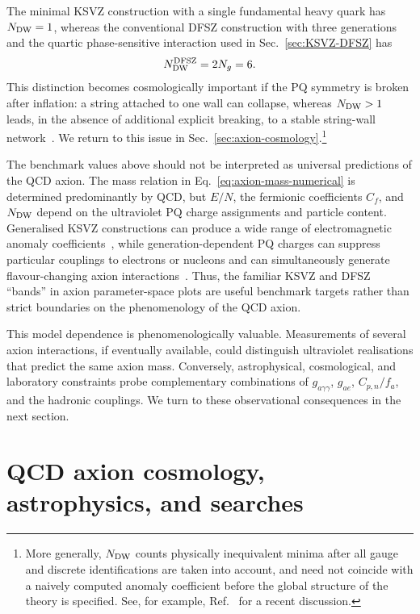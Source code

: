 \documentclass[review]{elsarticle}
\numberwithin{equation}{section}
\numberwithin{table}{section}
\numberwithin{figure}{section}
\begin{document}
The minimal KSVZ construction with a single fundamental heavy quark has $N_{\rm DW}=1$, whereas the conventional DFSZ construction with three generations and the quartic phase-sensitive interaction used in Sec.~\ref{sec:KSVZ-DFSZ} has
\begin{align}
    N_{\rm DW}^{\rm DFSZ}
    =
    2N_g
    =
    6.
    \label{eq:DFSZ-domain-wall-number}
\end{align}
This distinction becomes cosmologically important if the PQ symmetry is broken after inflation: a string attached to one wall can collapse, whereas $N_{\rm DW}>1$ leads, in the absence of additional explicit breaking, to a stable string-wall network~\cite{Sikivie:1982qv,Ringwald:2015dsf}. We return to this issue in Sec.~\ref{sec:axion-cosmology}.\footnote{More generally, $N_{\rm DW}$ counts physically inequivalent minima after all gauge and discrete identifications are taken into account, and need not coincide with a naively computed anomaly coefficient before the global structure of the theory is specified. See, for example, Ref.~\cite{Choi:2026oqz} for a recent discussion.}

The benchmark values above should not be interpreted as universal predictions of the QCD axion. The mass relation in Eq.~\eqref{eq:axion-mass-numerical} is determined predominantly by QCD, but $E/N$, the fermionic coefficients $C_f$, and $N_{\rm DW}$ depend on the ultraviolet PQ charge assignments and particle content. Generalised KSVZ constructions can produce a wide range of electromagnetic anomaly coefficients~\cite{DiLuzio:2017pfr,Agrawal:2017cmd}, while generation-dependent PQ charges can suppress particular couplings to electrons or nucleons and can simultaneously generate flavour-changing axion interactions~\cite{Bardeen:1986yb,DiLuzio:2017ogq,MartinCamalich:2020dfe,Sun:2021jpw}. Thus, the familiar KSVZ and DFSZ ``bands'' in axion parameter-space plots are useful benchmark targets rather than strict boundaries on the phenomenology of the QCD axion.

This model dependence is phenomenologically valuable. Measurements of several axion interactions, if eventually available, could distinguish ultraviolet realisations that predict the same axion mass. Conversely, astrophysical, cosmological, and laboratory constraints probe complementary combinations of $g_{a\gamma\gamma}$, $g_{ae}$, $C_{p,n}/f_a$, and the hadronic couplings. We turn to these observational consequences in the next section.

\section{QCD axion cosmology, astrophysics, and searches}
\label{sec:QCD-axion-aspects}
\end{document}

